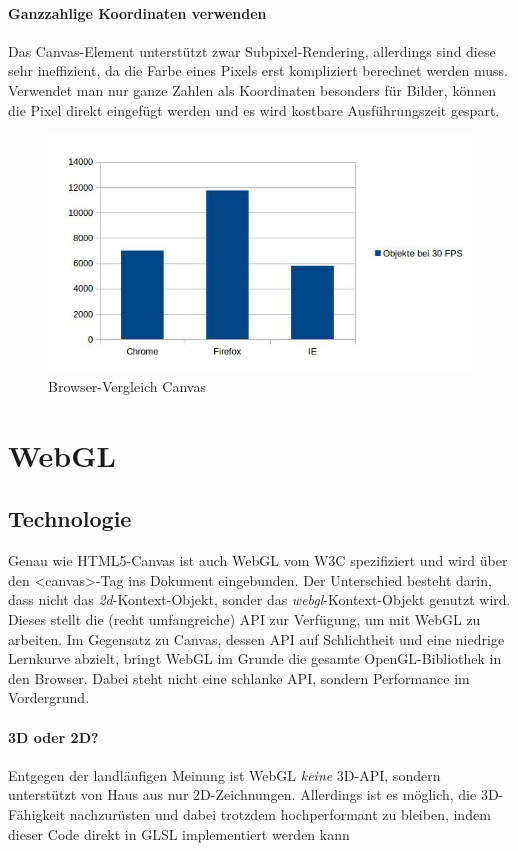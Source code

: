 \documentclass[a4paper, 12pt]{article}
\begin{document}
\paragraph{Ganzzahlige Koordinaten verwenden} Das Canvas-Element unterstützt zwar Subpixel-Rendering, allerdings sind diese sehr ineffizient, da die Farbe eines Pixels erst kompliziert berechnet werden muss. Verwendet man nur ganze Zahlen als Koordinaten besonders für Bilder, können die Pixel direkt eingefügt werden und es wird kostbare Ausführungszeit gespart.
\begin{figure}[H]
	\includegraphics[width=\textwidth]{assets/browser_comp_canvas} 
	\caption{Browser-Vergleich Canvas}
	\label{browser_comp_canvas}
\end{figure}
\newpage
\section{WebGL}
\subsection{Technologie}
Genau wie HTML5-Canvas ist auch WebGL vom W3C spezifiziert und wird über den <canvas>-Tag ins Dokument eingebunden. Der Unterschied besteht darin, dass nicht das \emph{2d}-Kontext-Objekt, sonder das \emph{webgl}-Kontext-Objekt genutzt wird. Dieses stellt die (recht umfangreiche) API zur Verfügung, um mit WebGL zu arbeiten. Im Gegensatz zu Canvas, dessen API auf Schlichtheit und eine niedrige Lernkurve abzielt, bringt WebGL im Grunde die gesamte OpenGL-Bibliothek in den Browser. Dabei steht nicht eine schlanke API, sondern Performance im Vordergrund.
\paragraph{3D oder 2D?} Entgegen der landläufigen Meinung ist WebGL \emph{keine} 3D-API, sondern unterstützt von Haus aus nur 2D-Zeichnungen. Allerdings ist es möglich, die 3D-Fähigkeit nachzurüsten und dabei trotzdem hochperformant zu bleiben, indem dieser Code direkt in GLSL implementiert werden kann
\end{document}
